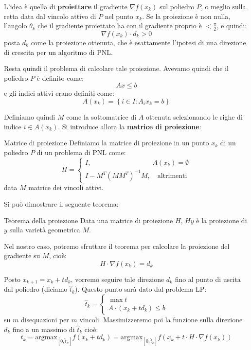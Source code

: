 \documentclass[a4paper,11pt]{article}
\begin{document}
L'idea è quella di \textbf{proiettare} il gradiente $\nabla f(x_k)$ sul poliedro $P$, o meglio sulla retta data dal vincolo attivo di $P$ nel punto $x_k$.
Se la proiezione è non nulla, l'angolo $\theta_k$ che il gradiente proiettato ha con il gradiente proprio è $< \frac{\pi}{2}$, e quindi:
$$
\nabla f(x_k) \cdot d_k > 0
$$
posta $d_k$ come la proiezione ottenuta, che è esattamente l'ipotesi di una direzione di crescita per un algoritmo di PNL.

Resta quindi il problema di calcolare tale proiezione.
Avevamo quindi che il poliedro $P$ è definito come:
$$
Ax \leq b
$$
e gli indici attivi erano definiti come:
$$
A(x_k) = \left\{ i \in I: A_ix_k = b \right\}
$$

Definiamo quindi $M$ come la sottomatrice di $A$ ottenuta selezionando le righe di indice $i \in A(x_k)$. 
Si introduce allora la \textbf{matrice di proiezione}:
\begin{definition}{Matrice di proiezione}
	Definiamo la matrice di proiezione in un punto $x_k$ di un poliedro $P$ di un problema di PNL come: 
	$$
		H = 
			\begin{cases}
				I , \quad \quad \quad \quad \quad \quad \quad \quad \quad  A(x_k) = \emptyset \\ 
				I - M^T(M M^T)^{-1} M, \quad \text{altrimenti}
			\end{cases}
	$$
	data $M$ matrice dei vincoli attivi.
\end{definition}

Si può dimostrare il seguente teorema:
\begin{theorem}{Teorema della proiezione}
	Data una matrice di proiezione $H$, $H y$ è la proiezione di $y$ sulla varietà geometrica $M$.
\end{theorem}

Nel nostro caso, potremo sfruttare il teorema per calcolare la proiezione del gradiente su $M$, cioè:
$$
H \cdot \nabla f(x_k) = d_k
$$


Posto $x_{k +1} = x_k + t d_k$, vorremo seguire tale direzione $d_k$ fino al punto di uscita dal poliedro (diciamo $\hat{t}_k$).
Questo punto sarà dato dal problema LP:
\[
	\hat{t}_k = 
	\begin{cases}
			\max t \\ 
			A\cdot(x_k + t d_k) \leq b
	\end{cases}
\]
su $m$ disequazioni per $m$ vincoli.
Massimizzeremo poi la funzione sulla direzione $d_k$ fino a un massimo di $\hat{t}_k$ cioè:
$$
t_k = \mathrm{argmax}_{[0, \hat{t}_k]} f(x_k + t d_k) = \mathrm{argmax}_{[0, \hat{t}_k]} f(x_k + t \cdot H \cdot \nabla f(x_k)) 
$$
\end{document}
